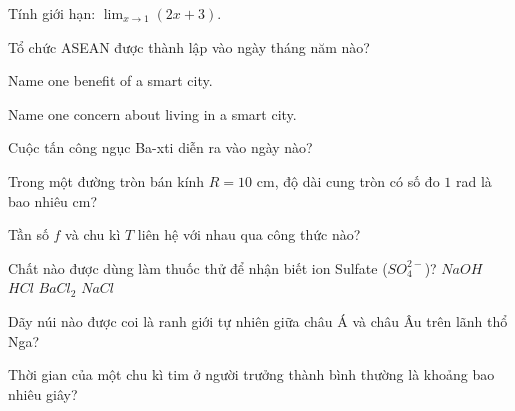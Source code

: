 \begin{ex}
    Tính giới hạn: $\lim_{x \to 1} (2x + 3)$.
\end{ex}
\begin{ex}
    Tổ chức ASEAN được thành lập vào ngày tháng năm nào?
\end{ex}
\begin{ex}
    \begin{chc}
        Name one benefit of a smart city.
    \end{chc}
    \begin{chc}
        Name one concern about living in a smart city.
    \end{chc}
\end{ex}
\begin{ex}
    Cuộc tấn công ngục Ba-xti diễn ra vào ngày nào?
\end{ex}
\begin{ex}
    Trong một đường tròn bán kính $R = 10$ cm, độ dài cung tròn có số đo $1$ rad là bao nhiêu cm?
\end{ex}
\begin{ex}
    Tần số $f$ và chu kì $T$ liên hệ với nhau qua công thức nào?
\end{ex}
\begin{ex}
    Chất nào được dùng làm thuốc thử để nhận biết ion Sulfate ($SO_4^{2-}$)?
    \choice
    {$NaOH$}
    {$HCl$}
    {\True $BaCl_2$}
    {$NaCl$}
\end{ex}
\begin{ex}
    Dãy núi nào được coi là ranh giới tự nhiên giữa châu Á và châu Âu trên lãnh thổ Nga?
\end{ex}
\begin{ex}
    Thời gian của một chu kì tim ở người trưởng thành bình thường là khoảng bao nhiêu giây?
\end{ex}
